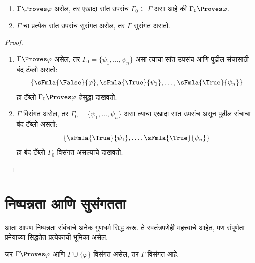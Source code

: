 \begin{prop}[संहतता]
  \label{fol:tab:ptn:prop:proves-compact}
  \begin{enumerate}
  \item $\Gamma \Proves \varphi$ असेल, तर एखादा सांत उपसंच $\Gamma_0
    \subseteq \Gamma$ असा आहे की $\Gamma_0 \Proves \varphi$.
  \item $\Gamma$ चा प्रत्येक सांत उपसंच सुसंगत असेल, तर $\Gamma$ सुसंगत
    असतो.
  \end{enumerate}
\end{prop}

\begin{proof}
  \begin{enumerate}
    \item $\Gamma \Proves \varphi$ असेल, तर $\Gamma_0 =
      \{\psi_1, \dots, \psi_n\}$ असा त्याचा सांत उपसंच आणि पुढील संचासाठी बंद टॅब्लो असतो:
      \[      \{\sFmla{\False}{\varphi}, \sFmla{\True}{\psi_1}, \dots, \sFmla{\True}{\psi_n}\}
      \]
      हा टॅब्लो $\Gamma_0 \Proves \varphi$ हेसुद्धा दाखवतो.
    \item $\Gamma$ विसंगत असेल, तर
      $\Gamma_0 = \{\psi_1, \dots, \psi_n\}$ असा त्याचा एखादा सांत उपसंच असून पुढील
      संचाचा बंद टॅब्लो असतो:
      \[      \{\sFmla{\True}{\psi_1}, \dots, \sFmla{\True}{\psi_n}\}
      \]
      हा बंद टॅब्लो $\Gamma_0$ विसंगत असल्याचे दाखवतो.
  \end{enumerate}
\end{proof}












\section{निष्पन्नता आणि सुसंगतता}\label{fol:tab:prv:sec}

आता आपण निष्पन्नता संबंधाचे अनेक गुणधर्म सिद्ध करू. ते स्वतंत्रपणेही
महत्त्वाचे आहेत, पण संपूर्णता प्रमेयाच्या सिद्धतेत प्रत्येकाची भूमिका असेल.

\begin{prop}\label{fol:tab:prv:prop:provability-contr}
  जर $\Gamma \Proves \varphi$ आणि $\Gamma \cup \{\varphi\}$ विसंगत असेल, तर
  $\Gamma$ विसंगत आहे.
\end{prop}

